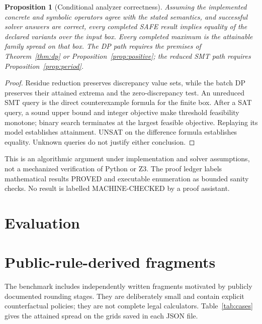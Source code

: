 \documentclass[11pt]{article}
\newtheorem{proposition}[theorem]{Proposition}
\begin{document}
\begin{proposition}[Conditional analyzer correctness]\label{prop:sound}
Assuming the implemented concrete and symbolic operators agree with the stated semantics, and successful solver answers are correct, every completed SAFE result implies equality of the declared variants over the input box. Every completed maximum is the attainable family spread on that box. The DP path requires the premises of Theorem~\ref{thm:dp} or Proposition~\ref{prop:positive}; the reduced SMT path requires Proposition~\ref{prop:period}.
\end{proposition}
\begin{proof}
Residue reduction preserves discrepancy value sets, while the batch DP preserves their attained extrema and the zero-discrepancy test. An unreduced SMT query is the direct counterexample formula for the finite box. After a SAT query, a sound upper bound and integer objective make threshold feasibility monotone; binary search terminates at the largest feasible objective. Replaying its model establishes attainment. UNSAT on the difference formula establishes equality. Unknown queries do not justify either conclusion.
\end{proof}
This is an algorithmic argument under implementation and solver assumptions, not a mechanized verification of Python or Z3. The proof ledger labels mathematical results PROVED and executable enumeration as bounded sanity checks. No result is labelled MACHINE-CHECKED by a proof assistant.

\section{Evaluation}
\label{sec:evaluation}


\section{Public-rule-derived fragments}
\label{sec:cases}
The benchmark includes independently written fragments motivated by publicly documented rounding stages. They are deliberately small and contain explicit counterfactual policies; they are not complete legal calculators. Table~\ref{tab:cases} gives the attained spread on the grids saved in each JSON file.
\begin{table}[ht]
\centering
\caption{Exact discrepancy on six rule-derived fragments. Values are cents. A difference establishes sensitivity of the stated comparison, not a defect in the cited rule or deployed software.}\label{tab:cases}
\end{table}
\end{document}
